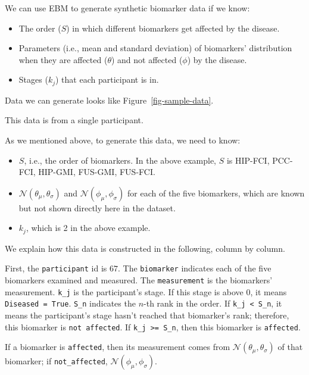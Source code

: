 \documentclass[
  letterpaper,
  DIV=11,
  numbers=noendperiod]{scrreprt}
\providecommand{\tightlist}{%
  \setlength{\itemsep}{0pt}\setlength{\parskip}{0pt}}\usepackage{longtable,booktabs,array}
\begin{document}
We can use EBM to generate synthetic biomarker data if we know:

\begin{itemize}
\tightlist
\item
  The order (\(S\)) in which different biomarkers get affected by the
  disease.
\item
  Parameters (i.e., mean and standard deviation) of biomarkers'
  distribution when they are affected (\(\theta\)) and not affected
  (\(\phi\)) by the disease.
\item
  Stages (\(k_j\)) that each participant is in.
\end{itemize}

Data we can generate looks like Figure~\ref{fig-sample-data}.

This data is from a single participant.

As we mentioned above, to generate this data, we need to know:

\begin{itemize}
\tightlist
\item
  \(S\), i.e., the order of biomarkers. In the above example, \(S\) is
  HIP-FCI, PCC-FCI, HIP-GMI, FUS-GMI, FUS-FCI.
\item
  \(\mathcal N(\theta_{\mu}, \theta_{\sigma})\) and
  \(\mathcal N(\phi_{\mu}, \phi_{\sigma})\) for each of the five
  biomarkers, which are known but not shown directly here in the
  dataset.
\item
  \(k_j\), which is 2 in the above example.
\end{itemize}

We explain how this data is constructed in the following, column by
column.

First, the \texttt{participant} id is \(67\). The \texttt{biomarker}
indicates each of the five biomarkers examined and measured. The
\texttt{measurement} is the biomarkers' measurement. \texttt{k\_j} is
the participant's stage. If this stage is above 0, it means
\texttt{Diseased\ =\ True}. \texttt{S\_n} indicates the \(n\)-th rank in
the order. If \texttt{k\_j\ \textless{}\ S\_n}, it means the
participant's stage hasn't reached that biomarker's rank; therefore,
this biomarker is \texttt{not\ affected}. If
\texttt{k\_j\ \textgreater{}=\ S\_n}, then this biomarker is
\texttt{affected}.

If a biomarker is \texttt{affected}, then its measurement comes from
\(\mathcal N(\theta_{\mu}, \theta_{\sigma})\) of that biomarker; if
\texttt{not\_affected}, \(\mathcal N(\phi_{\mu}, \phi_{\sigma})\).
\end{document}
